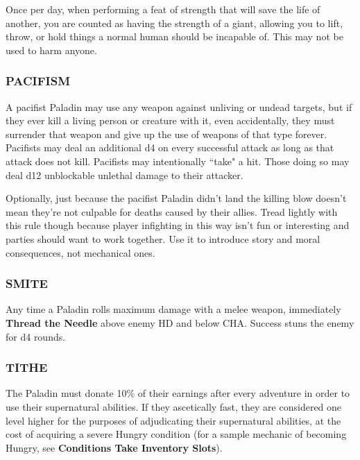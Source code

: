 \documentclass[twoside]{article}
\newcommand{\TTN}[2]{\textbf{Thread the Needle} above #1 and below #2}
\begin{document}
Once per day, when performing a feat of strength that will save the life of another, you are counted as having the strength of a giant, allowing you to lift, throw, or hold things a normal human should be incapable of. This may not be used to harm anyone.

\subsubsection*{\footnotesize{P}\scriptsize{ACIFISM}\normalsize}

A pacifist Paladin may use any weapon against unliving or undead targets, but if they ever kill a living person or creature with it, even accidentally, they must surrender that weapon and give up the use of weapons of that type forever. Pacifists may deal an additional d4 on every successful attack as long as that attack does not kill. Pacifists may intentionally ``take" a hit. Those doing so may deal d12 unblockable unlethal damage to their attacker.

\bigbreak

Optionally, just because the pacifist Paladin didn't land the killing blow doesn't mean they're not culpable for deaths caused by their allies. Tread lightly with this rule though because player infighting in this way isn't fun or interesting and parties should want to work together. Use it to introduce story and moral consequences, not mechanical ones.

\subsubsection*{\footnotesize{S}\scriptsize{MITE}\normalsize}

Any time a Paladin rolls maximum damage with a melee weapon, immediately \TTN{enemy HD}{CHA}. Success stuns the enemy for d4 rounds.

\subsubsection*{\footnotesize{T}\scriptsize{ITHE}\normalsize}

The Paladin must donate 10\% of their earnings after every adventure in order to use their supernatural abilities. If they ascetically fast, they are considered one level higher for the purposes of adjudicating their supernatural abilities, at the cost of acquiring a severe Hungry condition (for a sample mechanic of becoming Hungry, see \textbf{Conditions Take Inventory Slots}).
\end{document}

